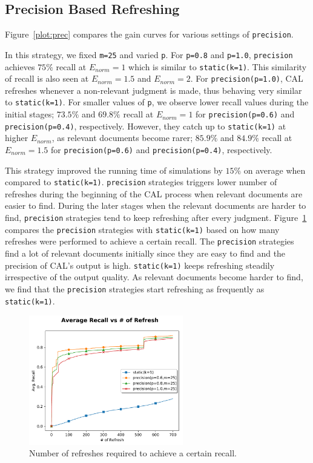 \subsection*{Precision Based Refreshing}

Figure~\ref{plot:prec} compares the gain curves for
various settings of \texttt{precision}.

In this strategy, we fixed \texttt{m=25} and varied \texttt{p}. For
\texttt{p=0.8} and \texttt{p=1.0}, \texttt{precision} achieves $75\%$ recall at
$E_{norm} = 1$ which is similar to \texttt{static(k=1)}. This
similarity of recall is also seen at $E_{norm} = 1.5$ and $E_{norm} = 2$. For
\texttt{precision(p=1.0)}, CAL refreshes whenever a non-relevant judgment
is made, thus behaving very similar to \texttt{static(k=1)}. For
smaller values of \texttt{p}, we observe lower recall values during the initial stages; 
$73.5\%$ and $69.8\%$ recall at $E_{norm} = 1$ for \texttt{precision(p=0.6)} and
\texttt{precision(p=0.4)}, respectively. However, they catch up to
\texttt{static(k=1)} at higher $E_{norm}$, as relevant documents
become rarer; $85.9\%$ and $84.9\%$ recall at $E_{norm} = 1.5$ for
\texttt{precision(p=0.6)} and \texttt{precision(p=0.4)}, respectively.

This strategy improved the running time of simulations by $15\%$
on average when compared to \texttt{static(k=1)}.
\texttt{precision} strategies triggers lower number of refreshes during the
beginning of the CAL process when relevant documents are easier to find. During
the later stages when the relevant documents are harder to find,
\texttt{precision} strategies tend to keep refreshing after every judgment.
Figure~\ref{plot:prec2} compares the \texttt{precision} strategies with
\texttt{static(k=1)} based on how many refreshes were performed to achieve a
certain recall. The \texttt{precision} strategies find a lot of relevant
documents initially since they are easy to find and the precision of CAL's
output is high. \texttt{static(k=1)} keeps refreshing steadily irrespective of
the output quality. As relevant documents become harder to find, we find that
the \texttt{precision} strategies start refreshing as frequently as
\texttt{static(k=1)}.

\begin{figure}
    \centering
    \includegraphics[width=0.6\textwidth]{plots/prec2.pdf}
    \caption{Number of refreshes required to achieve a certain recall.}
    \label{plot:prec2}
\end{figure}


